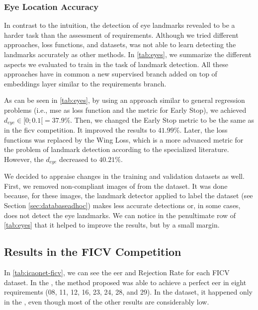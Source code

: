 

\subsubsection{Eye Location Accuracy}

In contrast to the intuition, the detection of eye landmarks revealed to be a harder task than the assessment of \icao requirements. Although we tried different approaches, loss functions, and datasets, \methodname was not able to learn detecting the landmarks accurately as other methods. In \autoref{tab:eyes}, we summarize the different aspects we evaluated to train \methodname in the task of landmark detection. All these approaches have in common a new supervised branch added on top of embeddings layer similar to the requirements branch. 

As can be seen in \autoref{tab:eyes}, by using an approach similar to general regression problems (i.e., \acs{mse} as loss function and the metric for Early Stop), we achieved $d_{eye} \in [0;0.1[ = 37.9\%$. Then, we changed the Early Stop metric to be the same as in the \acs{ficv} competition. It improved the results to $41.99\%$. Later, the loss functions was replaced by the Wing Loss, which is a more advanced metric for the problem of landmark detection according to the specialized literature. However, the $d_{eye}$ decreased to $40.21\%$.

We decided to appraise changes in the training and validation datasets as well. First, we removed non-compliant images of \darktintedlenses from the \adhoc dataset. It was done because, for these images, the landmark detector applied to label the dataset (see Section \ref{sec:databaseadhoc}) makes less accurate detections or, in some cases, does not detect the eye landmarks. We can notice in the penultimate row of \autoref{tab:eyes} that it helped to improve the results, but by a small margin.






\subsection{Results in the FICV Competition} \label{sec:ficv_results}

In \autoref{tab:icaonet-ficv}, we can see the \acl{eer} and Rejection Rate for each FICV dataset. In the \ficvtest, the method proposed was able to achieve a perfect \acs{eer} in eight requirements (08, 11, 12, 16, 23, 24, 28, and 29). In the \ficvofficial dataset, it happened only in the \veiloverface, even though most of the other results are considerably low. 

